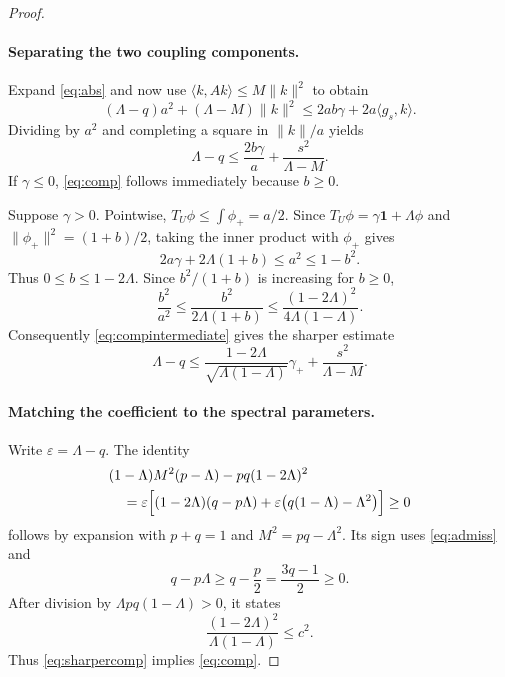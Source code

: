 \documentclass[11pt]{article}
\numberwithin{equation}{section}
\theoremstyle{remark}
\newcommand{\one}{\mathbf 1}
\newcommand{\norm}[1]{\lVert #1\rVert}
\newcommand{\ip}[2]{\langle #1,#2\rangle}
\begin{document}
\begin{proof}
\paragraph{Separating the two coupling components.}
Expand \eqref{eq:abs} and now use $\ip k{Ak}\le M\norm k^2$ to obtain
\[
 (\Lambda-q)a^2+(\Lambda-M)\norm k^2
 \le2ab\gamma+2a\ip{g_s}{k}.
\]
Dividing by $a^2$ and completing a square in $\norm k/a$ yields
\begin{equation}\label{eq:compintermediate}
 \Lambda-q\le\frac{2b\gamma}{a}+\frac{s^2}{\Lambda-M}.
\end{equation}
If $\gamma\le0$, \eqref{eq:comp} follows immediately because $b\ge0$.

Suppose $\gamma>0$. Pointwise, $T_U\phi\le\int\phi_+=a/2$. Since $T_U\phi=\gamma\one+\Lambda\phi$ and $\norm{\phi_+}^2=(1+b)/2$, taking the inner product with $\phi_+$ gives
\[
 2a\gamma+2\Lambda(1+b)\le a^2\le1-b^2.
\]
Thus $0\le b\le1-2\Lambda$. Since $b^2/(1+b)$ is increasing for $b\ge0$,
\[
 \frac{b^2}{a^2}\le\frac{b^2}{2\Lambda(1+b)}
 \le\frac{(1-2\Lambda)^2}{4\Lambda(1-\Lambda)}.
\]
Consequently \eqref{eq:compintermediate} gives the sharper estimate
\begin{equation}\label{eq:sharpercomp}
 \Lambda-q\le\frac{1-2\Lambda}{\sqrt{\Lambda(1-\Lambda)}}\gamma_+
 +\frac{s^2}{\Lambda-M}.
\end{equation}

\paragraph{Matching the coefficient to the spectral parameters.}
Write $\varepsilon=\Lambda-q$. The identity
\begin{align}\label{eq:parametercert}
 &(1-\Lambda)M^2(p-\Lambda)-pq(1-2\Lambda)^2\notag\\
 &\quad=\varepsilon\Bigl[(1-2\Lambda)(q-p\Lambda)
 +\varepsilon\bigl(q(1-\Lambda)-\Lambda^2\bigr)\Bigr]
 \ge0
\end{align}
follows by expansion with $p+q=1$ and $M^2=pq-\Lambda^2$. Its sign uses \eqref{eq:admiss} and
\[
 q-p\Lambda\ge q-\frac p2=\frac{3q-1}{2}\ge0.
\]
After division by $\Lambda pq(1-\Lambda)>0$, it states
\[
 \frac{(1-2\Lambda)^2}{\Lambda(1-\Lambda)}\le c^2.
\]
Thus \eqref{eq:sharpercomp} implies \eqref{eq:comp}.
\end{proof}
\end{document}
